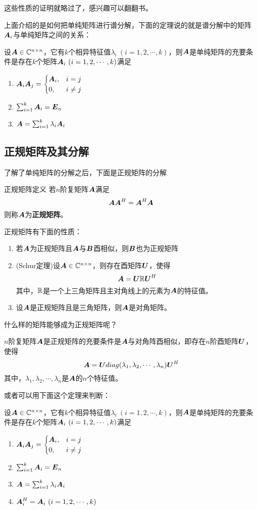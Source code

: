 \documentclass[12pt, a4paper, oneside, UTF8]{ctexbook}
\begin{document}
这些性质的证明就略过了，感兴趣可以翻翻书。


上面介绍的是如何把单纯矩阵进行谱分解，下面的定理说的就是谱分解中的矩阵$\boldsymbol{A}_i$与单纯矩阵之间的关系：
\begin{them}{}{}
    设$\boldsymbol{A}\in\mathbb{C}^{n\times n}$，它有$k$个相异特征值$\lambda_i\ (i=1,2,\cdots,k)$，则$\boldsymbol{A}$是单纯矩阵的充要条件是存在$k$个矩阵$\boldsymbol{A}_i\ (i=1,2,\cdots,k)$满足
    \begin{enumerate}
        \item $\boldsymbol{A}_i\boldsymbol{A}_j=\begin{cases}\boldsymbol{A}_i,&i=j\\0,&i\neq j\end{cases}$
        \item $\sum_{i=1}^{k}\boldsymbol{A}_i=\boldsymbol{E}_n$
        \item $\boldsymbol{A}=\sum_{i=1}^{k}\lambda_i\boldsymbol{A}_i$
    \end{enumerate}
\end{them}

\subsection{正规矩阵及其分解}
了解了单纯矩阵的分解之后，下面是正规矩阵的分解
\begin{defn}{正规矩阵定义}{}
    若$n$阶复矩阵$\boldsymbol{A}$满足\[\boldsymbol{A}\boldsymbol{A}^H=\boldsymbol{A}^H\boldsymbol{A}\]则称$\boldsymbol{A}$为\textbf{正规矩阵}。
\end{defn}
正规矩阵有下面的性质：
\begin{enumerate}[leftmargin=4em]
    \item 若$\boldsymbol{A}$为正规矩阵且$\boldsymbol{A}$与$\boldsymbol{B}$酉相似，则$\boldsymbol{B}$也为正规矩阵
    \item (Schur定理)设$\boldsymbol{A}\in\mathbb{C}^{n\times n}$，则存在酉矩阵$\boldsymbol{U}$，使得\[\boldsymbol{A}=\boldsymbol{U}\mathbb{R}\boldsymbol{U}^H\]其中，$\mathbb{R}$是一个上三角矩阵且主对角线上的元素为$\boldsymbol{A}$的特征值。
    \item 设$\boldsymbol{A}$是正规矩阵且是三角矩阵，则$\boldsymbol{A}$是对角矩阵。
\end{enumerate}

什么样的矩阵能够成为正规矩阵呢？
\begin{them}{}{}
    $n$阶复矩阵$\boldsymbol{A}$是正规矩阵的充要条件是$\boldsymbol{A}$与对角阵酉相似，即存在$n$阶酉矩阵$\boldsymbol{U}$，使得\[\boldsymbol{A}=\boldsymbol{U} diag(\lambda_1,\lambda_2,\cdots,\lambda_n)\boldsymbol{U}^H\]其中，$\lambda_1,\lambda_2,\cdots,\lambda_n$是$\boldsymbol{A}$的$n$个特征值。
\end{them}
或者可以用下面这个定理来判断：
\begin{them}{}{}
    设$\boldsymbol{A}\in\mathbb{C}^{n\times n}$，它有$k$个相异特征值$\lambda_i\ (i=1,2,\cdots,k)$，则$\boldsymbol{A}$是单纯矩阵的充要条件是存在$k$个矩阵$\boldsymbol{A}_i\ (i=1,2,\cdots,k)$满足
    \begin{enumerate}
        \item $\boldsymbol{A}_i\boldsymbol{A}_j=\begin{cases}\boldsymbol{A}_i,&i=j\\0,&i\neq j\end{cases}$
        \item $\sum_{i=1}^{k}\boldsymbol{A}_i=\boldsymbol{E}_n$
        \item $\boldsymbol{A}=\sum_{i=1}^{k}\lambda_i\boldsymbol{A}_i$
        \item $\A_i^H=\A_i\ (i=1,2,\cdots,k)$
    \end{enumerate}
\end{them}
\end{document}
